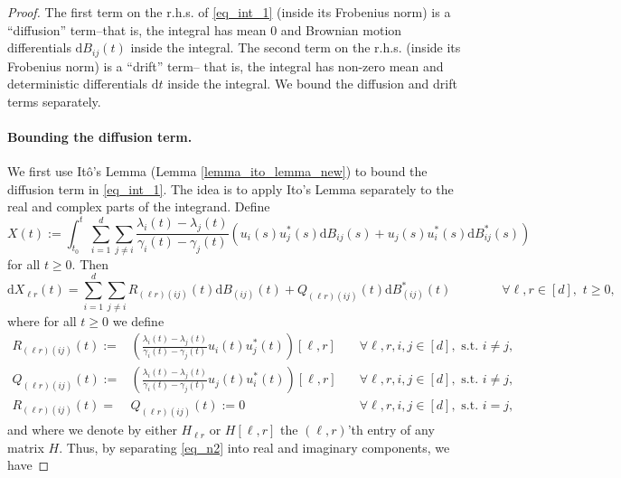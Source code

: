 \documentclass[11pt,letterpaper]{article}
\begin{document}
\begin{proof}
\noindent
The first term on the r.h.s. of \eqref{eq_int_1} (inside its Frobenius norm) is a ``diffusion'' term--that is, the integral has mean $0$ and Brownian motion differentials $\mathrm{d}B_{ij}(t)$ inside the integral.
%
The second term on the r.h.s. (inside its Frobenius norm) is a ``drift'' term-- that is, the integral has non-zero mean and deterministic differentials $\mathrm{d}t$ inside the integral.
%
We bound the diffusion and drift terms separately.

\paragraph{Bounding the diffusion term.}

We first use It\^o's Lemma (Lemma \ref{lemma_ito_lemma_new}) to bound the diffusion term in \eqref{eq_int_1}.
%
The idea is to apply Ito's Lemma separately to the real and complex parts of the integrand.
%
Define \begin{equation}\label{eq_n3}
    X(t):=  \int_{t_0}^{t}\sum_{i=1}^{d} \sum_{j \neq i} \frac{\lambda_i(t)- \lambda_j(t)}{\gamma_i(t) - \gamma_j(t)}(u_i(s) u_j^\ast(s)\mathrm{d}B_{ij}(s) + u_j(s) u_i^\ast(s)\mathrm{d}B_{ij}^\ast(s))
    \end{equation}
    for all $t \geq 0.$
%
Then
%
\begin{equation}\label{eq_n2}
\mathrm{d}X_{\ell r}(t) =  \sum_{i=1}^{d} \sum_{j \neq i} R_{(\ell r) (i j)}(t) \mathrm{d}B_{(ij)}(t) + Q_{(\ell r) (i j)}(t) \mathrm{d}B_{(ij)}^\ast(t) \qquad \qquad \forall \ell,r \in[d],\,\,  t \geq 0,
\end{equation}
%
where for all $t \geq0$ we define 
\begin{eqnarray}\label{eq_n5}
R_{(\ell r) (i j)}(t) :=& \left(\frac{\lambda_i(t)- \lambda_j(t)}{\gamma_i(t) - \gamma_j(t)}u_i(t) u_j^\ast(t) \right)[\ell, r] & \quad \forall \ell, r, i, j \in [d], \textrm{ s.t. } i \neq j,\nonumber\\
%
Q_{(\ell r) (i j)}(t) :=& \left(\frac{\lambda_i(t)- \lambda_j(t)}{\gamma_i(t) - \gamma_j(t)} u_j(t) u_i^\ast(t) \right)[\ell, r] & \quad \forall \ell, r, i, j \in [d], \textrm{ s.t. } i \neq j,\nonumber\\
%
R_{(\ell r) (i j)}(t) =& Q_{(\ell r) (i j)}(t) := 0 & \quad \forall \ell, r, i, j \in [d], \textrm{ s.t. } i = j,
\end{eqnarray}
%
and where we denote by either $H_{\ell r}$ or $H[\ell, r]$  the $(\ell, r)$'th entry of any matrix $H$.
%
Thus, by separating \eqref{eq_n2} into real and imaginary components, we have

\end{proof}
\end{document}
